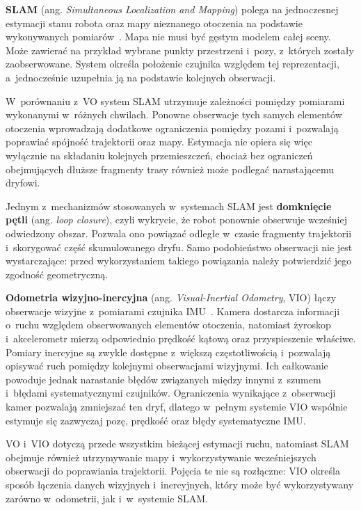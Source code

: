 \textbf{SLAM} (ang. \textit{Simultaneous Localization and Mapping}) polega na jednoczesnej estymacji stanu robota oraz mapy nieznanego otoczenia na podstawie wykonywanych pomiarów~\cite{cadena2016slam}. Mapa nie musi być gęstym modelem całej sceny. Może zawierać na przykład wybrane punkty przestrzeni i~pozy, z~których zostały zaobserwowane. System określa położenie czujnika względem tej reprezentacji, a~jednocześnie uzupełnia ją na podstawie kolejnych obserwacji.

W~porównaniu z~VO system SLAM utrzymuje zależności pomiędzy pomiarami wykonanymi w~różnych chwilach. Ponowne obserwacje tych samych elementów otoczenia wprowadzają dodatkowe ograniczenia pomiędzy pozami i~pozwalają poprawiać spójność trajektorii oraz mapy. Estymacja nie opiera się więc wyłącznie na składaniu kolejnych przemieszczeń, chociaż bez ograniczeń obejmujących dłuższe fragmenty trasy również może podlegać narastającemu dryfowi.

Jednym z~mechanizmów stosowanych w~systemach SLAM jest \textbf{domknięcie pętli} (ang. \textit{loop closure}), czyli wykrycie, że robot ponownie obserwuje wcześniej odwiedzony obszar. Pozwala ono powiązać odległe w~czasie fragmenty trajektorii i~skorygować część skumulowanego dryfu. Samo podobieństwo obserwacji nie jest wystarczające: przed wykorzystaniem takiego powiązania należy potwierdzić jego zgodność geometryczną.

\textbf{Odometria wizyjno-inercyjna} (ang. \textit{Visual-Inertial Odometry}, VIO) łączy obserwacje wizyjne z~pomiarami czujnika IMU~\cite{forster2015preintegration}. Kamera dostarcza informacji o~ruchu względem obserwowanych elementów otoczenia, natomiast żyroskop i~akcelerometr mierzą odpowiednio prędkość kątową oraz przyspieszenie właściwe. Pomiary inercyjne są zwykle dostępne z~większą częstotliwością i~pozwalają opisywać ruch pomiędzy kolejnymi obserwacjami wizyjnymi. Ich całkowanie powoduje jednak narastanie błędów związanych między innymi z~szumem i~błędami systematycznymi czujników. Ograniczenia wynikające z~obserwacji kamer pozwalają zmniejszać ten dryf, dlatego w~pełnym systemie VIO wspólnie estymuje się zazwyczaj pozę, prędkość oraz błędy systematyczne IMU.

VO i~VIO dotyczą przede wszystkim bieżącej estymacji ruchu, natomiast SLAM obejmuje również utrzymywanie mapy i~wykorzystywanie wcześniejszych obserwacji do poprawiania trajektorii. Pojęcia te nie są rozłączne: VIO określa sposób łączenia danych wizyjnych i~inercyjnych, który może być wykorzystywany zarówno w~odometrii, jak i~w~systemie SLAM.

